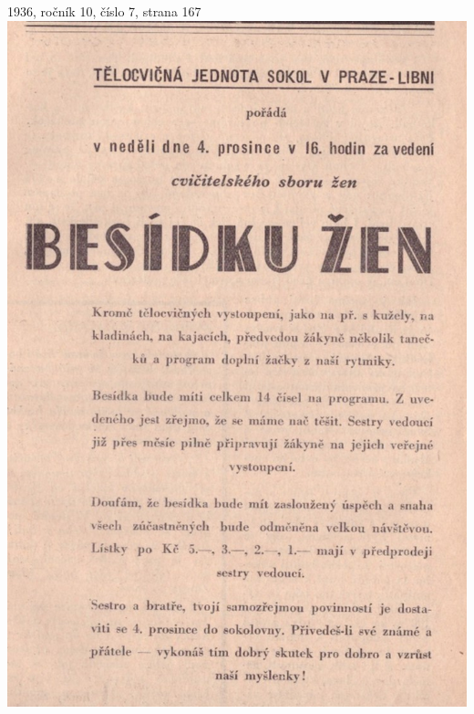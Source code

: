 \documentclass[11pt]{article}
\begin{document}
1936, ročník 10, číslo 7, strana 167 \\
\includegraphics[width=\imagewidth]{original/1936/Skener_20250323 (5).jpg}



\clearpage
\end{document}
